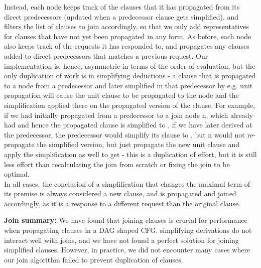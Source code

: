 Instead, each node keeps track of the clauses that it has propagated from its direct predecessors (updated when a predecessor clause gets simplified), and filters the list of clauses to join accordingly, so that we only add representatives for clauses that have not yet been propagated in any form. 
As before, each node also keeps track of the requests it has responded to, and propagates any clauses added to direct predecessors that matches a previous request.
Our implementation is, hence, asymmetric in terms of the order of evaluation, but the only duplication of work is in simplifying deductions - a clause that is propagated to a node from a predecessor and later simplified in that predecessor by e.g. unit propagation will cause the unit clause to be propagated to the node and the simplification applied there on the propagated version of the clause.
For example, if we had initially propagated  from a predecessor to a join node n, which already had  and hence the propagated clause is simplified to , if we have later derived  at the predecessor, the predecessor would simplify its clause to , but n would not re-propagate the simplified version, but just propagate the new unit clause  and apply the simplification as well to get  - this is a duplication of effort, but it is still less effort than recalculating the join from scratch or fixing the join to be optimal.\\
In all cases, the conclusion of a simplification that changes the maximal term of its premise is always considered a new clause, 
and is propagated and joined accordingly, as it is a response to a different request than the original clause.

\textbf{Join summary:} We have found that joining clauses is crucial for performance when propagating clauses in a DAG shaped CFG.
simplifying derivations do not interact well with joins, and we have not found a perfect solution for joining simplified clauses.
However, in practice, we did not encounter many cases where our join algorithm failed to prevent duplication of clauses.



